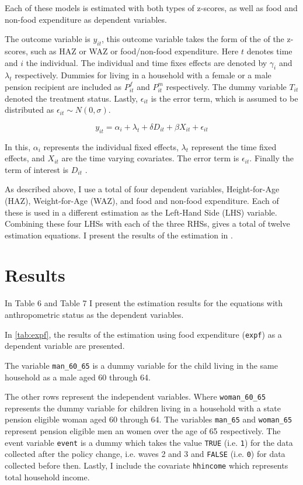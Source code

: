 \documentclass[a4paper,british]{article}\usepackage[]{graphicx}\usepackage[]{color}
\newcommand{\code}[1]{\texttt{#1}}
\let\ref\autoref
\begin{document}
Each of these models is estimated with both types of z-scores, as
well as food and non-food expenditure as dependent variables. 

The outcome variable is $y_{it}$, this outcome variable takes the
form of the of the z-scores, such as HAZ or WAZ or food/non-food expenditure.
Here $t$ denotes time and $i$ the individual. The individual and
time fixes effects are denoted by $\gamma_{i}$ and $\lambda_{t}$
respectively. Dummies for living in a household with a female or a
male pension recipient are included as $P_{it}^{f}$ and $P_{it}^{m}$
respectively. The dummy variable $T_{it}$ denoted the treatment status.
Lastly, $\epsilon_{it}$ is the error term, which is assumed to be
distributed as $\epsilon_{it}\sim N(0,\sigma)$.

\begin{equation}
y_{it}=\alpha_{i}+\lambda_{t}+\delta D{}_{it}+\beta X_{it}+\epsilon_{it}\label{eq:m1}
\end{equation}

In this, $\alpha_{i}$ represents the individual fixed effects, $\lambda_{t}$
represent the time fixed effects, and $X_{it}$ are the time varying
covariates. The error term is $\epsilon_{it}$. Finally the term of
interest is $D_{it}$ . 

As described above, I use a total of four dependent variables, Height-for-Age
(HAZ), Weight-for-Age (WAZ), and food and non-food expenditure. Each
of these is used in a different estimation as the Left-Hand Side (LHS)
variable. Combining these four LHSs with each of the three RHSs, gives
a total of twelve estimation equations. I present the results of the
estimation in .

\section{Results}

\label{sec:results} In  Table 6 and Table 7 I present the estimation
results for the equations with anthropometric status as the dependent
variables.

In \ref{tab:expf}, the results of the estimation using food expenditure
(\code{expf}) as a dependent variable are presented.

The variable \code{man\_60\_65} is a dummy variable for the child
living in the same household as a male aged 60 through 64.

The other rows represent the independent variables. Where \code{woman\_60\_65}
represents the dummy variable for children living in a household with
a state pension eligible woman aged 60 through 64. The variables \code{man\_65}
and \code{woman\_65} represent pension eligible men an women over
the age of 65 respectively. The event variable \code{event} is a
dummy which takes the value \code{TRUE} (i.e. \code{1}) for the
data collected after the policy change, i.e. waves 2 and 3 and \code{FALSE}
(i.e. \code{0}) for data collected before then. Lastly, I include
the covariate \code{hhincome} which represents total household income.
\end{document}
